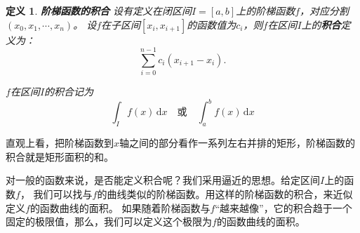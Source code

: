 \documentclass[12pt,UTF8]{ctexbook}
\newcommand{\di}[1]{\,\mathrm{d}#1}
\newtheorem{df}{定义}[section]
\begin{document}
\begin{df}{\textbf{阶梯函数的积合}}
    设有定义在闭区间$I=[a, b]$上的阶梯函数$f$，对应分割$(x_0, x_1, \cdots , x_n)$。
    设$f$在子区间$[x_i, x_{i+1}]$的函数值为$c_i$，则$f$在区间$I$上的\textbf{积合}定义为：
    $$ \sum_{i=0}^{n-1} c_i(x_{i+1} - x_i).$$
    
    $f$在区间$I$的积合记为
    $$ \int_I f(x)\di{x} \quad \mbox{或} \quad \int_a^b f(x)\di{x} $$
\end{df}

直观上看，把阶梯函数到$x$轴之间的部分看作一系列左右并排的矩形，阶梯函数的积合就是矩形面积的和。

对一般的函数来说，是否能定义积合呢？我们采用逼近的思想。给定区间$I$上的函数$f$，
我们可以找与$f$的曲线类似的阶梯函数。用这样的阶梯函数的积合，来近似定义$f$的函数曲线的面积。
如果随着阶梯函数与$f$“越来越像”，它的积合趋于一个固定的极限值，那么，我们可以定义这个极限为$f$的函数曲线的面积。











\end{document}
